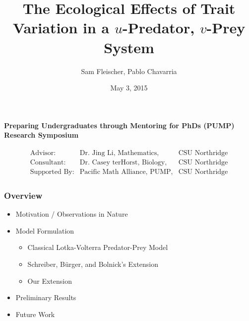 \documentclass[10pt]{beamer}
\title{The Ecological Effects of Trait Variation in a $u$-Predator, $v$-Prey System}
\author{Sam Fleischer, Pablo Chavarria}
\date{May 3, 2015}
\begin{document}
\begin{frame}
	\titlepage
	\begin{center}
		{\bf Preparing Undergraduates through Mentoring for PhDs (PUMP) Research Symposium}
	\end{center}
	\begin{align*}
		\begin{array}{lll}
		\text{Advisor:} & \text{Dr. Jing Li, Mathematics,} & \text{CSU Northridge} \\
		\text{Consultant:} & \text{Dr. Casey terHorst, Biology,} & \text{CSU Northridge} \\
		\text{Supported By:} & \text{Pacific Math Alliance, PUMP,} & \text{CSU Northridge}
		\end{array}
	\end{align*}
\end{frame}

\begin{frame}
	\frametitle{Overview}
	\begin{itemize}
		\item Motivation / Observations in Nature
		\item Model Formulation
		\begin{itemize}
			\item Classical Lotka-Volterra Predator-Prey Model
			\item Schreiber, B\"urger, and Bolnick's Extension
			\item Our Extension
		\end{itemize}
		\item Preliminary Results
		\item Future Work
	\end{itemize}
\end{frame}
\end{document}
